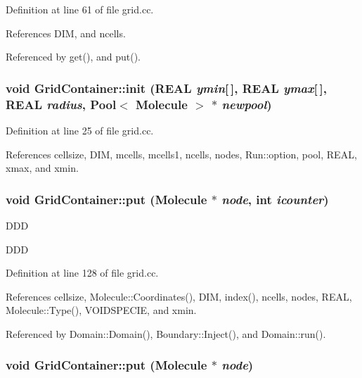 Definition at line 61 of file grid.cc.

References DIM, and ncells.

Referenced by get(), and put().\hypertarget{namespaceGridContainer_3c2159285b7a2cb3ed85be77f4c4a9f1}{
\subsubsection[{init}]{\setlength{\rightskip}{0pt plus 5cm}void GridContainer::init (REAL {\em ymin}\mbox{[}$\,$\mbox{]}, \/  REAL {\em ymax}\mbox{[}$\,$\mbox{]}, \/  REAL {\em radius}, \/  {\bf Pool}$<$ {\bf Molecule} $>$ $\ast$ {\em newpool})}}
\label{namespaceGridContainer_3c2159285b7a2cb3ed85be77f4c4a9f1}




Definition at line 25 of file grid.cc.

References cellsize, DIM, mcells, mcells1, ncells, nodes, Run::option, pool, REAL, xmax, and xmin.\hypertarget{namespaceGridContainer_e124418779521e23e19f513829d3126e}{
\subsubsection[{put}]{\setlength{\rightskip}{0pt plus 5cm}void GridContainer::put ({\bf Molecule} $\ast$ {\em node}, \/  int {\em icounter})}}
\label{namespaceGridContainer_e124418779521e23e19f513829d3126e}




DDD

DDD 

Definition at line 128 of file grid.cc.

References cellsize, Molecule::Coordinates(), DIM, index(), ncells, nodes, REAL, Molecule::Type(), VOIDSPECIE, and xmin.

Referenced by Domain::Domain(), Boundary::Inject(), and Domain::run().\hypertarget{namespaceGridContainer_845e12d4267175b1b7a424e34f257bd3}{
\subsubsection[{put}]{\setlength{\rightskip}{0pt plus 5cm}void GridContainer::put ({\bf Molecule} $\ast$ {\em node})}}
\label{namespaceGridContainer_845e12d4267175b1b7a424e34f257bd3}




